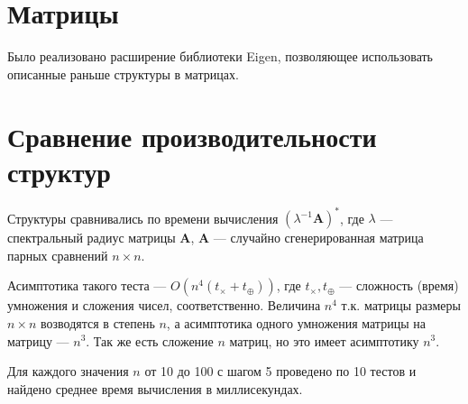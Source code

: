 \documentclass[specialist, substylefile = spbureport.rtx,
               subf,href,colorlinks=true, 12pt]{disser}
\begin{document}


    \section{Матрицы}
    Было реализовано расширение библиотеки Eigen, позволяющее использовать описанные раньше структуры в матрицах.


    
    \section{Сравнение производительности структур}

    Структуры сравнивались по времени вычисления $(\lambda^{-1}\bm{A})^*$, где $\lambda$ --- спектральный радиус матрицы $\bm{A}$, $\bm{A}$ --- случайно сгенерированная матрица парных сравнений $n\times n$.

    Асимптотика такого теста --- $O(n^4 (t_\times + t_\oplus))$, где $t_\times, t_\oplus$ --- сложность (время) умножения и сложения чисел, соответственно.
    Величина $n^4$ т.к. матрицы размеры $n\times n$ возводятся в степень $n$, а асимптотика одного умножения матрицы на матрицу --- $n^3$. Так же есть сложение $n$ матриц, но это имеет асимптотику $n^3$.

    Для каждого значения $n$ от 10 до 100 с шагом 5 проведено по 10 тестов и найдено среднее время вычисления в миллисекундах.
\end{document}
